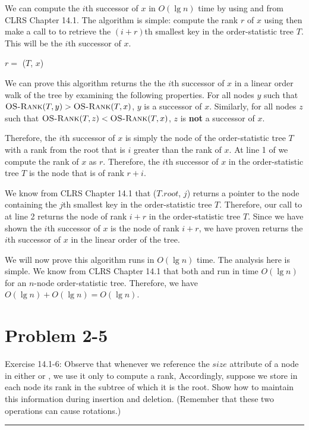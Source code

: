 \documentclass[11pt]{article}
\def\separateline{\medskip\hrule\medskip}
\begin{document}
We can compute the $i$th successor of $x$ in $O(\lg{n})$ time by using  and  from CLRS Chapter 14.1. The algorithm is simple: compute the rank $r$ of $x$ using  then make a call to  to retrieve the $(i + r)$th smallest key in the order-statistic tree $T$. This will be the $i$th successor of $x$.

\begin{codebox}
\li $r = $ ($T$, $x$)
\li {}
\end{codebox}

We can prove this algorithm returns the the $i$th successor of $x$ in a linear order walk of the tree by examining the following properties. For all nodes $y$ such that $\textnormal{\scshape OS-Rank}(T,y) > \textnormal{\scshape OS-Rank}(T,x)$, $y$ is a successor of $x$. Similarly, for all nodes $z$ such that $\textnormal{\scshape OS-Rank}(T,z) < \textnormal{\scshape OS-Rank}(T,x)$, $z$ is \textbf{not} a successor of $x$.

Therefore, the $i$th successor of $x$ is simply the node of the order-statistic tree $T$ with a rank from the root that is $i$ greater than the rank of $x$. At line 1 of  we compute the rank of $x$ as $r$. Therefore, the $i$th successor of $x$ in the order-statistic tree $T$ is the node that is of rank $r + i$.

We know from CLRS Chapter 14.1 that ($T.root$, $j$) returns a pointer to the node containing the $j$th smallest key in the order-statistic tree $T$. Therefore, our call to  at line 2 returns the node of rank $i + r$ in the order-statistic tree $T$. Since we have shown the $i$th successor of $x$ is the node of rank $i + r$, we have proven  returns the $i$th successor of $x$ in the linear order of the tree.

We will now prove this algorithm runs in $O(\lg{n})$ time. The analysis here is simple. We know from CLRS Chapter 14.1 that both  and  run in time $O(\lg{n})$ for an $n$-node order-statistic tree. Therefore, we have $O(\lg{n}) + O(\lg{n}) = O(\lg{n})$.


\newpage

\section{Problem 2-5}
Exercise 14.1-6: Observe that whenever we reference the $size$ attribute of a node in either  or , we use it only to compute a rank, Accordingly, suppose we store in each node its rank in the subtree of which it is the root. Show how to maintain this information during insertion and deletion. (Remember that these two operations can cause rotations.)
\separateline
\end{document}
